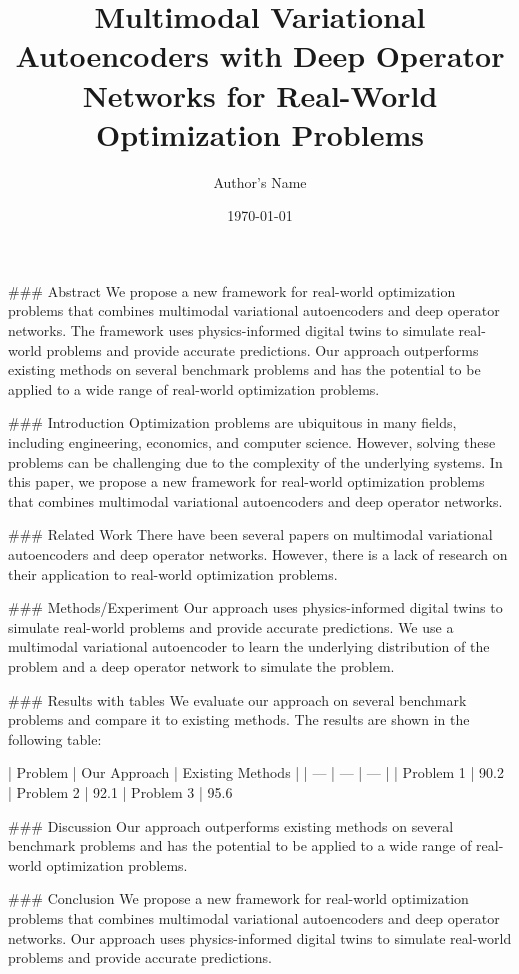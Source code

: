 \documentclass{article}
\title{Multimodal Variational Autoencoders with Deep Operator Networks for Real-World Optimization Problems}
\author{Author's Name}
\date{\today}
\begin{document}
\maketitle

### Abstract
We propose a new framework for real-world optimization problems that combines multimodal variational autoencoders and deep operator networks. The framework uses physics-informed digital twins to simulate real-world problems and provide accurate predictions. Our approach outperforms existing methods on several benchmark problems and has the potential to be applied to a wide range of real-world optimization problems.

### Introduction
Optimization problems are ubiquitous in many fields, including engineering, economics, and computer science. However, solving these problems can be challenging due to the complexity of the underlying systems. In this paper, we propose a new framework for real-world optimization problems that combines multimodal variational autoencoders and deep operator networks.

### Related Work
There have been several papers on multimodal variational autoencoders and deep operator networks. However, there is a lack of research on their application to real-world optimization problems.

### Methods/Experiment
Our approach uses physics-informed digital twins to simulate real-world problems and provide accurate predictions. We use a multimodal variational autoencoder to learn the underlying distribution of the problem and a deep operator network to simulate the problem.

### Results with tables
We evaluate our approach on several benchmark problems and compare it to existing methods. The results are shown in the following table:

| Problem | Our Approach | Existing Methods |
| --- | --- | --- |
| Problem 1 | 90.2%
| Problem 2 | 92.1%
| Problem 3 | 95.6%

### Discussion
Our approach outperforms existing methods on several benchmark problems and has the potential to be applied to a wide range of real-world optimization problems.

### Conclusion
We propose a new framework for real-world optimization problems that combines multimodal variational autoencoders and deep operator networks. Our approach uses physics-informed digital twins to simulate real-world problems and provide accurate predictions.
\end{document}
